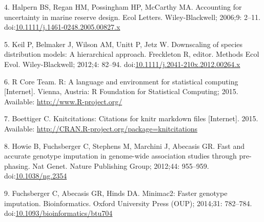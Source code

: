 \documentclass[]{article}
\begin{document}
4. Halpern BS, Regan HM, Possingham HP, McCarthy MA. Accounting for
uncertainty in marine reserve design. Ecol Letters. Wiley-Blackwell;
2006;9: 2--11.
doi:\href{http://dx.doi.org/10.1111/j.1461-0248.2005.00827.x}{10.1111/j.1461-0248.2005.00827.x}

5. Keil P, Belmaker J, Wilson AM, Unitt P, Jetz W. Downscaling of
species distribution models: A hierarchical approach. Freckleton R,
editor. Methods Ecol Evol. Wiley-Blackwell; 2012;4: 82--94.
doi:\href{http://dx.doi.org/10.1111/j.2041-210x.2012.00264.x}{10.1111/j.2041-210x.2012.00264.x}

6. R Core Team. R: A language and environment for statistical computing
{[}Internet{]}. Vienna, Austria: R Foundation for Statistical Computing;
2015. Available: \url{http://www.R-project.org/}

7. Boettiger C. Knitcitations: Citations for knitr markdown files
{[}Internet{]}. 2015. Available:
\url{http://CRAN.R-project.org/package=knitcitations}

8. Howie B, Fuchsberger C, Stephens M, Marchini J, Abecasis GR. Fast and
accurate genotype imputation in genome-wide association studies through
pre-phasing. Nat Genet. Nature Publishing Group; 2012;44: 955--959.
doi:\href{http://dx.doi.org/10.1038/ng.2354}{10.1038/ng.2354}

9. Fuchsberger C, Abecasis GR, Hinds DA. Minimac2: Faster genotype
imputation. Bioinformatics. Oxford University Press (OUP); 2014;31:
782--784.
doi:\href{http://dx.doi.org/10.1093/bioinformatics/btu704}{10.1093/bioinformatics/btu704}
\end{document}
